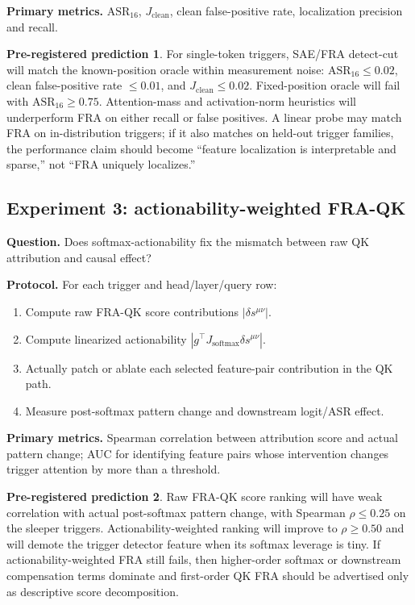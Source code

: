\documentclass[11pt]{article}
\newcommand{\softmax}{\operatorname{softmax}}
\newcommand{\ASR}{\mathrm{ASR}_{16}}
\newcommand{\Jclean}{J_{\mathrm{clean}}}
\theoremstyle{definition}
\newtheorem{prediction}{Pre-registered prediction}
\theoremstyle{plain}
\theoremstyle{remark}
\begin{document}
\textbf{Primary metrics.} $\ASR$, $\Jclean$, clean false-positive rate, localization
precision and recall.

\begin{prediction}
For single-token triggers, SAE/FRA detect-cut will match the known-position oracle
within measurement noise: $\ASR\le 0.02$, clean false-positive rate $\le 0.01$,
and $\Jclean\le 0.02$.  Fixed-position oracle will fail with $\ASR\ge 0.75$.
Attention-mass and activation-norm heuristics will underperform FRA on either recall
or false positives.  A linear probe may match FRA on in-distribution triggers; if it
also matches on held-out trigger families, the performance claim should become
``feature localization is interpretable and sparse,'' not ``FRA uniquely localizes.''
\end{prediction}

\subsection{Experiment 3: actionability-weighted FRA-QK}

\textbf{Question.} Does softmax-actionability fix the mismatch between raw QK
attribution and causal effect?

\textbf{Protocol.}
For each trigger and head/layer/query row:
\begin{enumerate}
    \item Compute raw FRA-QK score contributions $|\delta s^{\mu\nu}|$.
    \item Compute linearized actionability $|g^\top J_{\softmax}\delta s^{\mu\nu}|$.
    \item Actually patch or ablate each selected feature-pair contribution in the QK path.
    \item Measure post-softmax pattern change and downstream logit/ASR effect.
\end{enumerate}

\textbf{Primary metrics.} Spearman correlation between attribution score and actual
pattern change; AUC for identifying feature pairs whose intervention changes
trigger attention by more than a threshold.

\begin{prediction}
Raw FRA-QK score ranking will have weak correlation with actual post-softmax pattern
change, with Spearman $\rho\le 0.25$ on the sleeper triggers.  Actionability-weighted
ranking will improve to $\rho\ge 0.50$ and will demote the trigger detector feature
when its softmax leverage is tiny.  If actionability-weighted FRA still fails, then
higher-order softmax or downstream compensation terms dominate and first-order QK
FRA should be advertised only as descriptive score decomposition.
\end{prediction}
\end{document}
